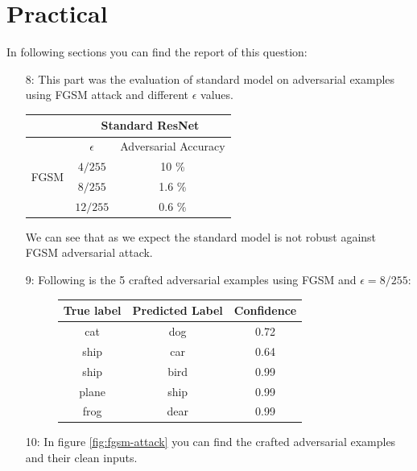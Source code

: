 \documentclass[12]{article}
\begin{document}
	\pagebreak
	\section{Practical}
	In following sections you can find the report of this question:
	\begin{enumerate}
		\item[8:] This part was the evaluation of standard model on adversarial examples using FGSM attack and different $\epsilon$ values.
		\begin{table}[H]
			\centering
			\begin{tabular}{|c|c|c|}
				\hline
				&\multicolumn{2}{|c|}{Standard ResNet} \\
				\hline\hline
				\multirow{4}{*}{FGSM} & $\epsilon$ & Adversarial Accuracy \\
				\cline{2-3}
				& $4/255$ & 10 \% \\
				\cline{2-3}
				& $8/255$ & 1.6 \% \\
				\cline{2-3}
				& $12/255$ & 0.6 \% \\
				\hline
			\end{tabular}
		\end{table}
		We can see that as we expect the standard model is not robust against FGSM adversarial attack.
		\item[9:]
		Following is the 5 crafted adversarial examples using FGSM and $\epsilon = 8/255$:
		\begin{figure}[H]
			\centering
			\begin{tabular}{|c|c|c|}
				\hline
				True label & Predicted Label & Confidence \\
				\hline
				cat & dog & 0.72 \\
				ship & car & 0.64 \\
				ship & bird & 0.99 \\
				plane & ship & 0.99 \\
				frog & dear & 0.99 \\
				\hline
			\end{tabular}
		\end{figure}
		\item[10:] In figure \ref{fig:fgsm-attack} you can find the crafted adversarial examples and their clean inputs.
		\begin{figure}[H]
			\centering

\end{figure}
\end{enumerate}
\end{document}
